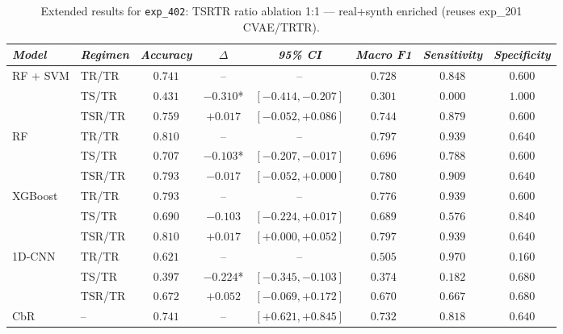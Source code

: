 \begin{table}[H]
\centering
\scriptsize
\caption{Extended results for \texttt{exp\_402}: TSRTR ratio ablation 1:1 — real+synth enriched (reuses exp\_201 CVAE/TRTR).}
\label{tab:appendix_exp_402}
\begin{tabular*}{\textwidth}{@{\extracolsep{\fill}}llcccccc}
\toprule
\emph{Model} & \emph{Regimen} & \emph{Accuracy} & \emph{$\Delta$} & \emph{95\% CI} & \emph{Macro F1} & \emph{Sensitivity} & \emph{Specificity}\\
\midrule
\multirow{3}{*}{RF + SVM} & TR/TR & $0.741$ & -- & -- & $0.728$ & $0.848$ & $0.600$\\
 & TS/TR & $0.431$ & $-0.310$* & $[-0.414, -0.207]$ & $0.301$ & $0.000$ & $1.000$\\
 & TSR/TR & $0.759$ & $+0.017$ & $[-0.052, +0.086]$ & $0.744$ & $0.879$ & $0.600$\\
\midrule
\multirow{3}{*}{RF} & TR/TR & $0.810$ & -- & -- & $0.797$ & $0.939$ & $0.640$\\
 & TS/TR & $0.707$ & $-0.103$* & $[-0.207, -0.017]$ & $0.696$ & $0.788$ & $0.600$\\
 & TSR/TR & $0.793$ & $-0.017$ & $[-0.052, +0.000]$ & $0.780$ & $0.909$ & $0.640$\\
\midrule
\multirow{3}{*}{XGBoost} & TR/TR & $0.793$ & -- & -- & $0.776$ & $0.939$ & $0.600$\\
 & TS/TR & $0.690$ & $-0.103$ & $[-0.224, +0.017]$ & $0.689$ & $0.576$ & $0.840$\\
 & TSR/TR & $0.810$ & $+0.017$ & $[+0.000, +0.052]$ & $0.797$ & $0.939$ & $0.640$\\
\midrule
\multirow{3}{*}{1D-CNN} & TR/TR & $0.621$ & -- & -- & $0.505$ & $0.970$ & $0.160$\\
 & TS/TR & $0.397$ & $-0.224$* & $[-0.345, -0.103]$ & $0.374$ & $0.182$ & $0.680$\\
 & TSR/TR & $0.672$ & $+0.052$ & $[-0.069, +0.172]$ & $0.670$ & $0.667$ & $0.680$\\
\midrule
CbR & -- & $0.741$ & -- & $[+0.621, +0.845]$ & $0.732$ & $0.818$ & $0.640$\\
\bottomrule
\end{tabular*}
\end{table}

